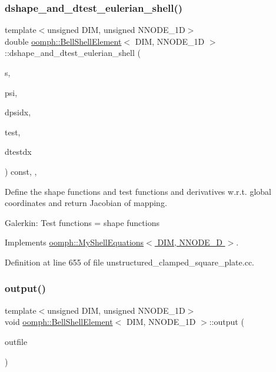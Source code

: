 \subsubsection{\texorpdfstring{dshape\+\_\+and\+\_\+dtest\+\_\+eulerian\+\_\+shell()}{dshape\_and\_dtest\_eulerian\_shell()}}
{\footnotesize\ttfamily template$<$unsigned D\+IM, unsigned N\+N\+O\+D\+E\+\_\+1D$>$ \\
double \hyperlink{classoomph_1_1BellShellElement}{oomph\+::\+Bell\+Shell\+Element}$<$ D\+IM, N\+N\+O\+D\+E\+\_\+1D $>$\+::dshape\+\_\+and\+\_\+dtest\+\_\+eulerian\+\_\+shell (\begin{DoxyParamCaption}\item[{const Vector$<$ double $>$ \&}]{s,  }\item[{Shape \&}]{psi,  }\item[{D\+Shape \&}]{dpsidx,  }\item[{Shape \&}]{test,  }\item[{D\+Shape \&}]{dtestdx }\end{DoxyParamCaption}) const\hspace{0.3cm}{\ttfamily [inline]}, {\ttfamily [protected]}, {\ttfamily [virtual]}}

Define the shape functions and test functions and derivatives w.\+r.\+t. global coordinates and return Jacobian of mapping.

Galerkin\+: Test functions = shape functions 

Implements \hyperlink{classoomph_1_1MyShellEquations_ac0cb5a90f9eceb2406c21c1e1dc662e7}{oomph\+::\+My\+Shell\+Equations$<$ D\+I\+M, N\+N\+O\+D\+E\+\_\+D $>$}.



Definition at line 655 of file unstructured\+\_\+clamped\+\_\+square\+\_\+plate.\+cc.

\mbox{\label{classoomph_1_1BellShellElement_aebeebfbb5296217e3b6492392df3aeb5}} 
\subsubsection{\texorpdfstring{output()}{output()}\hspace{0.1cm}{\footnotesize\ttfamily [1/4]}}
{\footnotesize\ttfamily template$<$unsigned D\+IM, unsigned N\+N\+O\+D\+E\+\_\+1D$>$ \\
void \hyperlink{classoomph_1_1BellShellElement}{oomph\+::\+Bell\+Shell\+Element}$<$ D\+IM, N\+N\+O\+D\+E\+\_\+1D $>$\+::output (\begin{DoxyParamCaption}\item[{std\+::ostream \&}]{outfile }\end{DoxyParamCaption})\hspace{0.3cm}{\ttfamily [inline]}}



